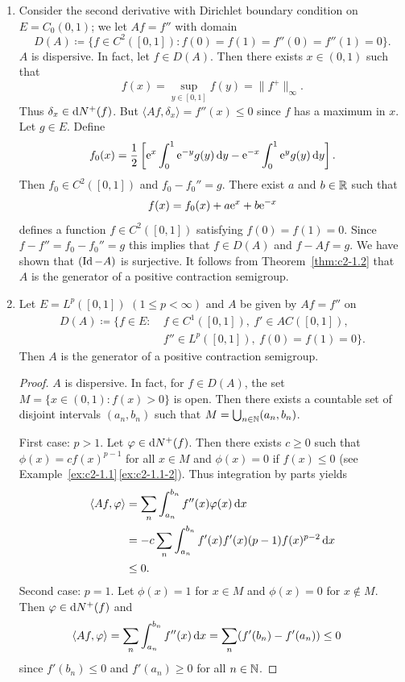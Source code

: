 \begin{examples}\label{ex:c2-1.5}
%
\begin{enumerate}[\upshape (i), wide, labelindent=.25em] %
\item \label{ex:c2-1.5-1}
Consider the second derivative with Dirichlet boundary condition on $E = C_{0}(0,1)$; \ie we let $Af = f''$ with domain 
\[
D(A) \coloneq \{f \in C^{2}([0,1]) \colon f(0) = f(1) = f''(0) = f''(1) = 0\} .
\]
$A$ is dispersive. 
In fact, let $f \in D(A)$. 
Then there exists $x \in (0,1)$ such that 
\[
f(x) = \sup_{y \in [0,1]} f(y) = \|f^{+}\|_{\infty}.
\]
Thus $\delta_{x} \in \mathop{}\!\mathrm{d}{N^{+}}(f)$. 
But $\langle Af,\delta_{x} \rangle = f''(x) \leq 0$ since $f$ has a maximum in $x$.
Let $g \in E$. 
Define 
\[
f_{0}(x) = \frac{1}{2} \left[\mathrm{e}^{x} \int_{0}^{1} \mathrm{e}^{-y}g(y) \mathop{}\!\mathrm{d}{y} - \mathrm{e}^{-x} \int_{0}^{1} \mathrm{e}^{y}g(y) \mathop{}\!\mathrm{d}{y} \right].
\]
Then $f_{0} \in C^{2}([0,1])$ and $f_{0} - f_{0}'' = g$. 
There exist $a$ and $ b \in \mathbb{R}$ such that 
%
\[
	f(x) = f_{0}(x) + a\mathrm{e}^{x} + b\mathrm{e}^{-x}
\]
%
defines a function $f \in C^{2}([0,1])$ satisfying $f(0) = f(1) = 0$. Since $f - f'' = f_{0} - f_{0}'' = g$ this implies that $f \in D(A)$ and $f - Af = g$. We have shown that $(\operatorname{Id} - A)$ is surjective. It follows from 
Theorem~\ref{thm:c2-1.2} that $A$ is the generator of a positive contraction semigroup.
\item \label{ex:c2-1.5-2}
Let $E = L^{p}([0,1])$ $(1 \leq p < \infty)$ and $A$ be given by $Af = f''$ on 
\begin{align*}
D(A) \coloneqq \{f \in E \colon\ &f \in C^{1}([0,1]),\ f' \in AC([0,1]), \\
    &f'' \in L^{p}([0,1]),\ f(0) = f(1) = 0\}.
\end{align*}
Then $A$ is the generator of a positive contraction semigroup.
\begin{proof}
$A$ is dispersive. 
In fact, for $f \in D(A)$, the set $M = \{x \in (0,1) \colon f(x) > 0\}$ is open. Then there exists a countable set of disjoint intervals $(a_{n},b_{n})$ such that $M = \bigcup_{n \in \mathbb{N}} (a_{n},b_{n})$.

First case: $p > 1$.
Let $\phi \in \diff{N^{+}}(f)$. 
Then there exists $c \geq 0$ such that $\phi(x) = c f(x)^{p-1}$ for all $x \in M$ and $\phi(x) = 0$ if\/ $f(x) \leq 0$ (see Example~\ref{ex:c2-1.1}\,\ref{ex:c2-1.1-2}). 
Thus integration by parts yields
\begin{align*}
\langle Af,\phi \rangle &= \sum_{n} \int_{a_{n}}^{b_{n}} f''(x)\phi(x) \dx \\
&= -c \sum_{n} \int_{a_{n}}^{b_{n}} f'(x)f'(x) (p-1)f(x)^{p-2}  \dx \\
&\leq 0.
\end{align*}
Second case: $p = 1$.
Let $\phi(x) = 1$ for $x \in M$ and $\phi(x) = 0$ for $x \not\in M$. 
Then $\phi \in \diff{N^{+}}(f)$ and
\begin{align*}
\langle Af,\phi \rangle &= \sum_{n} \int_{a_{n}}^{b_{n}} f''(x) \dx = \sum_{n} (f'(b_{n}) - f'(a_{n})) \leq 0
\end{align*}
since $f'(b_{n}) \leq 0$ and $f'(a_{n}) \geq 0$ for all $n \in \mathbb{N}$.


\end{proof}
\end{enumerate}
\end{examples}
